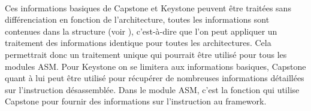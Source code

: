 \documentclass[11pt, book, english, french, standardlists]{upmethodology-document}
\begin{document}
				\paragraph*{}
					Ces informations basiques de Capstone et Keystone peuvent être traitées sans différenciation en fonction de l'architecture, toutes les informations sont contenues dans la structure  (voir ), c'est-à-dire que l'on peut appliquer un traitement des informations identique pour toutes les architectures. Cela permettrait donc un traitement unique qui pourrait être utilisé pour tous les modules ASM.
					Pour Keystone on se limitera aux informations basiques, Capstone quant à lui peut être utilisé pour récupérer de nombreuses informations détaillées sur l'instruction désassemblée. Dans le module ASM, c'est la fonction  qui utilise Capstone pour fournir des informations sur l'instruction au framework.
\end{document}
